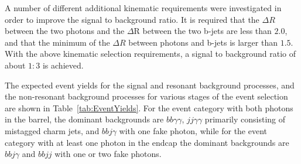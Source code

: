 A number of different additional kinematic requirements were investigated in order to improve the signal to background ratio. It is required that the $\Delta R$ between the two photons and the $\Delta$R between the two b-jets are less than $2.0$, and that the minimum of the  $\Delta R$ between photons and b-jets is larger than $1.5$. With the above kinematic selection requirements, a signal to background ratio of about $1:3$ is achieved.

The expected event yields for the signal and resonant background processes, and the  non-resonant background processes for various stages of the event selection
are shown in Table~\ref{tab:EventYields}. For the event category with both photons in the barrel, the dominant backgrounds are $bb\gamma\gamma$, $jj\gamma\gamma$ primarily consisting of mistagged charm jets, and $bbj\gamma$ with one fake photon, while for the event category with at least one photon in the endcap the dominant backgrounds are $bbj\gamma$ and $bbjj$ with one or two fake photons.

